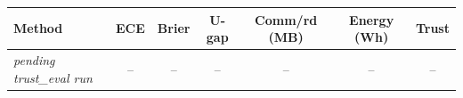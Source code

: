 \begin{tabular}{lcccccc}
\toprule
Method & ECE & Brier & U-gap & Comm/rd (MB) & Energy (Wh) & Trust \\
\midrule
\textit{pending trust\_eval run} & -- & -- & -- & -- & -- & -- \\
\bottomrule
\end{tabular}

